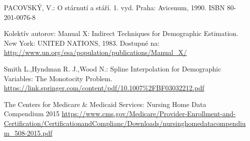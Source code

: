 \documentclass[a4paper, 11pt]{article}
\begin{document}
\begin{thebibliography}{9}
 PACOVSKÝ, V.: O stárnutí a stáří. 1. vyd. Praha: Avicenum, 1990. ISBN 80-201-0076-8

 Kolektív autorov: Manual X: Indirect Techniques for Demographic Estimation. New York: UNITED NATIONS, 1983. Dostupné na:
\url{http://www.un.org/esa/population/publications/Manual_X/}

 Smith L.,Hyndman R. J.,Wood N.: Spline Interpolation for Demographic Variables:
The Monotocity Problem. 
\url{https://link.springer.com/content/pdf/10.1007%2FBF03032212.pdf}

 The Centers for Medicare \& Medicaid Services: Nursing Home Data Compendium 2015 
\url{https://www.cms.gov/Medicare/Provider-Enrollment-and-Certification/CertificationandComplianc/Downloads/nursinghomedatacompendium_508-2015.pdf}
\end{thebibliography}
\end{document}
